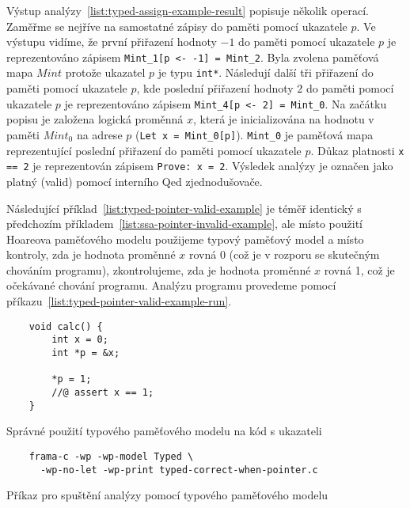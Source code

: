 Výstup analýzy~\ref{list:typed-assign-example-result} popisuje několik operací.
Zaměřme se nejříve na samostatné zápisy do paměti pomocí ukazatele $p$.
Ve výstupu vidíme, že první přiřazení hodnoty $-1$ do paměti pomocí ukazatele $p$
je reprezentováno zápisem \texttt{Mint\_1[p <- -1] = Mint\_2}.
Byla zvolena paměťová mapa $Mint$ protože ukazatel $p$ je typu \texttt{int*}.
Následují další tři přiřazení do paměti pomocí ukazatele $p$,
kde poslední přiřazení hodnoty $2$ do paměti pomocí ukazatele $p$ je reprezentováno zápisem
\texttt{Mint\_4[p <- 2] = Mint\_0}.
Na začátku popisu je založena logická proměnná $x$,
která je inicializována na hodnotu v paměti $Mint_0$ na adrese $p$ (\texttt{Let x = Mint\_0[p]}).
\texttt{Mint\_0} je paměťová mapa reprezentující poslední přiřazení do paměti pomocí ukazatele $p$.
Důkaz platnosti \texttt{x == 2} je reprezentován zápisem \texttt{Prove: x = 2}.
Výsledek analýzy je označen jako platný (valid) pomocí interního Qed zjednodušovače.

Následující příklad~\ref{list:typed-pointer-valid-example} je téměř identický
s předchozím příkladem~\ref{list:ssa-pointer-invalid-example},
ale místo použití Hoareova paměťového modelu použijeme typový paměťový model
a místo kontroly, zda je hodnota proměnné $x$ rovná 0 (což je v rozporu se skutečným chováním programu),
zkontrolujeme, zda je hodnota proměnné $x$ rovná 1, což je očekávané chování programu.
Analýzu programu provedeme pomocí příkazu~\ref{list:typed-pointer-valid-example-run}.

\begin{listing}[H]
    \begin{verbatim}
    void calc() {
        int x = 0;
        int *p = &x;

        *p = 1;
        //@ assert x == 1;
    }
    \end{verbatim}
    \caption{Správné použití typového paměťového modelu na kód s ukazateli}
    \label{list:typed-pointer-valid-example}
\end{listing}

\begin{listing}[H]
    \begin{verbatim}
    frama-c -wp -wp-model Typed \
      -wp-no-let -wp-print typed-correct-when-pointer.c
    \end{verbatim}
    \caption{Příkaz pro spuštění analýzy pomocí typového paměťového modelu}
    \label{list:typed-pointer-valid-example-run}
\end{listing}

